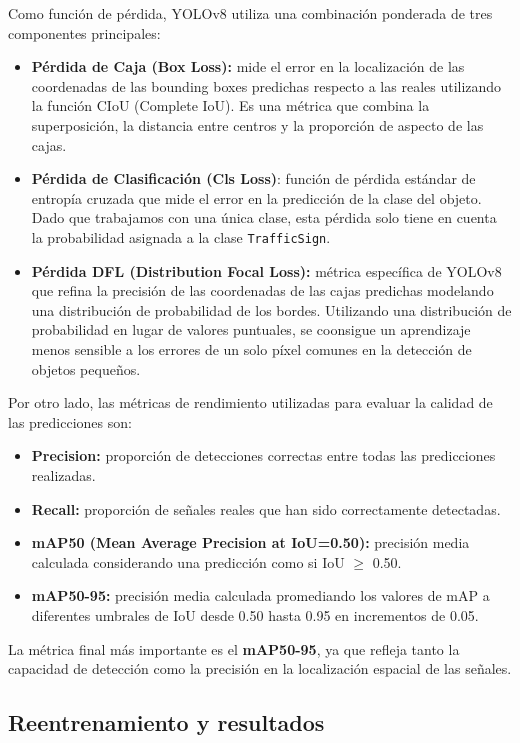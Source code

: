 \documentclass[11pt,a4paper]{article}
\begin{document}
Como función de pérdida, YOLOv8 utiliza una combinación ponderada de tres componentes principales:
\begin{itemize}
    \item \textbf{Pérdida de Caja (Box Loss):} mide el error en la localización de las coordenadas de las bounding
    boxes predichas respecto a las reales utilizando la función CIoU (Complete IoU). Es una métrica
    que combina la superposición, la distancia entre centros y la proporción de aspecto de las cajas.
    \item \textbf{Pérdida de Clasificación (Cls Loss)}: función de pérdida estándar de entropía cruzada
    que mide el error en la predicción de la clase del objeto. Dado que trabajamos con una única clase,
    esta pérdida solo tiene en cuenta la probabilidad asignada a la clase \texttt{TrafficSign}.
    \item \textbf{Pérdida DFL (Distribution Focal Loss):} métrica específica de YOLOv8 que refina 
    la precisión de las coordenadas de las cajas predichas modelando una distribución de probabilidad 
    de los bordes. Utilizando una distribución de probabilidad en lugar de valores puntuales,
    se coonsigue un aprendizaje menos sensible a los errores de un solo píxel comunes en la detección de
    objetos pequeños.
\end{itemize}

Por otro lado, las métricas de rendimiento utilizadas para evaluar la calidad de las predicciones son:
\begin{itemize}
    \item \textbf{Precision:} proporción de detecciones correctas entre todas las predicciones realizadas.
    \item \textbf{Recall:} proporción de señales reales que han sido correctamente detectadas.
    \item \textbf{mAP50 (Mean Average Precision at IoU=0.50):} precisión media calculada considerando una predicción 
    como si IoU $\geq$ 0.50.
    \item \textbf{mAP50-95:} precisión media calculada promediando los valores de mAP a diferentes umbrales de IoU 
    desde 0.50 hasta 0.95 en incrementos de 0.05.
\end{itemize}
La métrica final más importante es el \textbf{mAP50-95}, ya que refleja tanto la capacidad de detección como la precisión en la localización espacial de las señales.

\subsection{Reentrenamiento y resultados}
\end{document}

